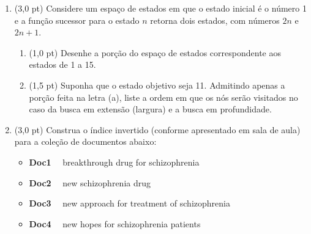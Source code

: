 \documentclass[12pt,a4paper,oneside]{article}
\begin{document}
\begin{enumerate}
	\item (3,0 pt) Considere um espaço de estados em que o estado inicial é o número 1 e a função sucessor para o estado $n$ retorna dois estados, com números $2n$ e $2n+1$.

		\begin{enumerate}
			\item (1,0 pt) Desenhe a porção do espaço de estados correspondente aos estados de 1 a 15.
			\item (1,5 pt) Suponha que o estado objetivo seja 11. Admitindo apenas a porção feita na letra (a), liste a ordem em que os nós serão visitados no caso da busca em extensão (largura) e a busca em profundidade.
		\end{enumerate}
	
	\item (3,0 pt) Construa o índice invertido (conforme apresentado em sala de aula) para a coleção de documentos abaixo:
		
		\begin{itemize}
			\item[] {\bf Doc1} \ \ breakthrough drug for schizophrenia
			\item[] {\bf Doc2} \ \ new schizophrenia drug
			\item[] {\bf Doc3} \ \ new approach for treatment of schizophrenia
			\item[] {\bf Doc4} \ \ new hopes for schizophrenia patients
		\end{itemize}
	
	\end{enumerate}
\end{document}
